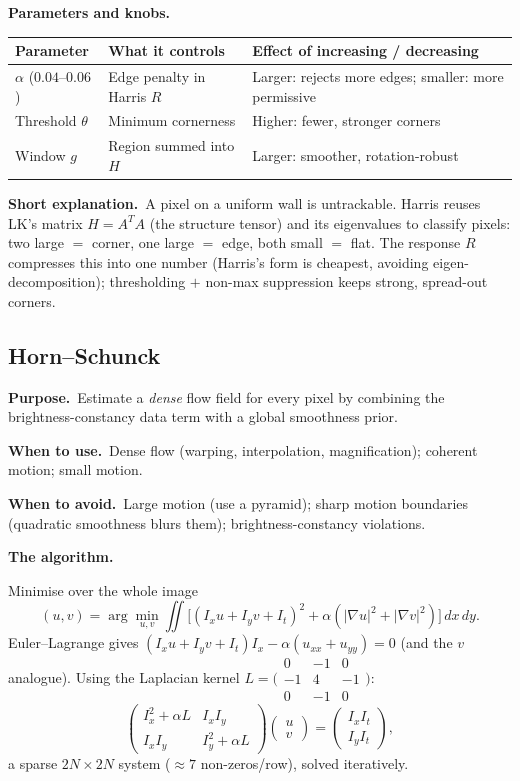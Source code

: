 \documentclass[10pt]{article}
\makeatletter
\newcommand{\Purpose}{\par\smallskip\textbf{Purpose.}\ }
\newcommand{\WhenUse}{\par\textbf{When to use.}\ }
\newcommand{\WhenAvoid}{\par\textbf{When to avoid.}\ }
\newcommand{\TheAlgo}{\par\smallskip\textbf{The algorithm.}\par\nopagebreak}
\newcommand{\Knobs}{\par\smallskip\textbf{Parameters and knobs.}\par\nopagebreak}
\newcommand{\ShortExp}{\par\smallskip\textbf{Short explanation.}\ }
\newcommand{\Ix}{I_x}\newcommand{\Iy}{I_y}\newcommand{\It}{I_t}
\newenvironment{ptable}{\begin{center}\small\begin{tabular}{@{}p{2.5cm} p{5.9cm} p{6.2cm}@{}}\toprule
Parameter & What it controls & Effect of increasing / decreasing \\ \midrule}
{\bottomrule\end{tabular}\end{center}}
\makeatother
\begin{document}
\Knobs
\begin{ptable}
$\alpha$ ($0.04$--$0.06$) & Edge penalty in Harris $R$ & Larger: rejects more edges; smaller: more permissive \\
Threshold $\theta$ & Minimum cornerness & Higher: fewer, stronger corners \\
Window $g$ & Region summed into $H$ & Larger: smoother, rotation-robust \\
\end{ptable}
\ShortExp A pixel on a uniform wall is untrackable. Harris reuses LK's matrix $H=A^TA$ (the structure
tensor) and its eigenvalues to classify pixels: two large $=$ corner, one large $=$ edge, both small $=$
flat. The response $R$ compresses this into one number (Harris's form is cheapest, avoiding
eigen-decomposition); thresholding $+$ non-max suppression keeps strong, spread-out corners.

\subsection{Horn--Schunck}\label{sub:hs}
\Purpose Estimate a \emph{dense} flow field for every pixel by combining the brightness-constancy data
term with a global smoothness prior.
\WhenUse Dense flow (warping, interpolation, magnification); coherent motion; small motion.
\WhenAvoid Large motion (use a pyramid); sharp motion boundaries (quadratic smoothness blurs them);
brightness-constancy violations.
\TheAlgo Minimise over the whole image
\[
(u,v)=\arg\min_{u,v}\iint\big[(\Ix u+\Iy v+\It)^2+\alpha(|\nabla u|^2+|\nabla v|^2)\big]\,dx\,dy .
\]
Euler--Lagrange gives $(\Ix u+\Iy v+\It)\Ix-\alpha(u_{xx}+u_{yy})=0$ (and the $v$ analogue). Using the
Laplacian kernel $L=\big(\begin{smallmatrix}0&-1&0\\-1&4&-1\\0&-1&0\end{smallmatrix}\big)$:
\[
\begin{pmatrix}\Ix^2+\alpha L&\Ix\Iy\\ \Ix\Iy&\Iy^2+\alpha L\end{pmatrix}\begin{pmatrix}u\\v\end{pmatrix}
=\begin{pmatrix}\Ix\It\\ \Iy\It\end{pmatrix},
\]
a sparse $2N\times2N$ system ($\approx7$ non-zeros/row), solved iteratively.
\end{document}
